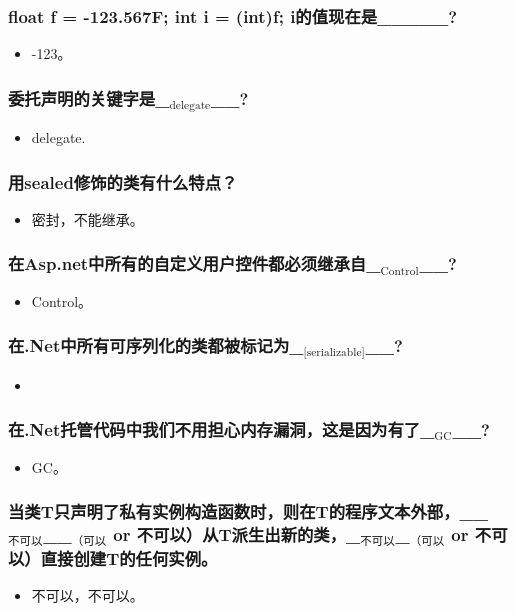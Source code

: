 \documentclass[9pt, b5paper]{article}
\begin{document}
\subsubsection{float f = -123.567F; int i = (int)f; i的值现在是\_\_\_\_\_?}
\label{sec-1-1-82}
\begin{itemize}
\item -123。
\end{itemize}
\subsubsection{委托声明的关键字是\_$_{\text{delegate}}$\_\_?}
\label{sec-1-1-83}
\begin{itemize}
\item delegate.
\end{itemize}
\subsubsection{用sealed修饰的类有什么特点？}
\label{sec-1-1-84}
\begin{itemize}
\item 密封，不能继承。
\end{itemize}
\subsubsection{在Asp.net中所有的自定义用户控件都必须继承自\_$_{\text{Control}}$\_\_?}
\label{sec-1-1-85}
\begin{itemize}
\item Control。
\end{itemize}
\subsubsection{在.Net中所有可序列化的类都被标记为\_$_{\text{[serializable]}}$\_\_?}
\label{sec-1-1-86}
\begin{itemize}
\item\relax [serializable]
\end{itemize}
\subsubsection{在.Net托管代码中我们不用担心内存漏洞，这是因为有了\_$_{\text{GC}}$\_\_?}
\label{sec-1-1-87}
\begin{itemize}
\item GC。
\end{itemize}
\subsubsection{当类T只声明了私有实例构造函数时，则在T的程序文本外部，\_\_$_{\text{不可以}}$\_\_$_{\text{（可以}}$ or 不可以）从T派生出新的类，\_$_{\text{不可以}}$\_$_{\text{（可以}}$ or 不可以）直接创建T的任何实例。}
\label{sec-1-1-88}
\begin{itemize}
\item 不可以，不可以。
\end{itemize}
\end{document}

